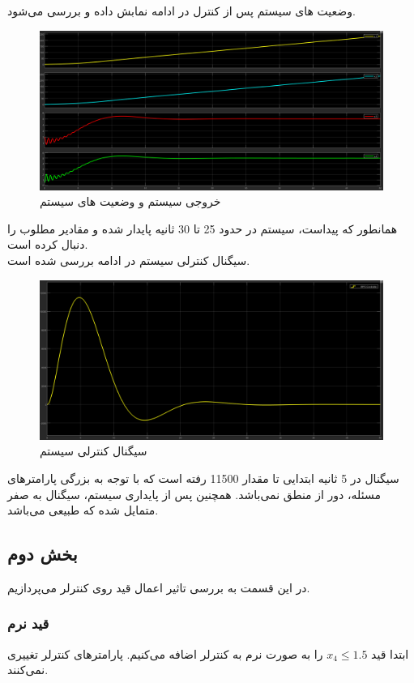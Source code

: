 \documentclass[14pt, a4paper]{extarticle}
\begin{document}
وضعیت 
های سیستم پس از کنترل در ادامه نمابش داده و بررسی می‌شود.
\begin{figure}[h!]
	\centering
	\includegraphics[scale = 0.4]{Q2_1_States.png}
	\caption{خروجی سیستم و وضعیت 
های سیستم}
\end{figure}

همانطور که پیداست،‌ سیستم در حدود 25 تا 30 ثانیه پایدار شده و مقادیر مطلوب را دنبال کرده است.\\
\newpage
سیگنال کنترلی سیستم در ادامه بررسی شده است.
\begin{figure}[h!]
	\centering
	\includegraphics[scale = 0.4]{Q2_1_control.png}
	\caption{سیگنال کنترلی سیستم}
\end{figure}

سیگنال در 5 ثانیه ابتدایی تا مقدار 11500 رفته است که با توجه به بزرگی پارامترهای مسئله،‌ دور از منطق نمی‌باشد. همچنین پس از پایداری سیستم، سیگنال به صفر متمایل شده که طبیعی می‌باشد.

\newpage
\subsection{بخش دوم}
در این قسمت به بررسی تاثیر اعمال قید روی کنترلر می‌پردازیم.
\subsubsection{قید نرم}
ابتدا قید 
$x_4 \leq 1.5$
را به صورت نرم به کنترلر اضافه می‌کنیم. پارامترهای کنترلر تغییری نمی‌کنند.
\end{document}
